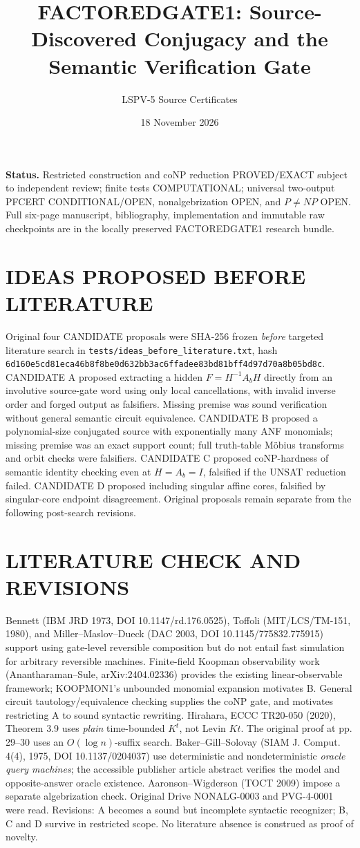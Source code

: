 \documentclass[11pt]{article}
\title{FACTOREDGATE1: Source-Discovered Conjugacy and the Semantic Verification Gate}
\author{LSPV-5 Source Certificates}
\date{18 November 2026}
\begin{document}
\maketitle
\noindent\textbf{Status.} Restricted construction and coNP reduction PROVED/EXACT subject to independent review; finite tests COMPUTATIONAL; universal two-output PFCERT CONDITIONAL/OPEN, nonalgebrization OPEN, and $P\ne NP$ OPEN. Full six-page manuscript, bibliography, implementation and immutable raw checkpoints are in the locally preserved FACTOREDGATE1 research bundle.

\section{IDEAS PROPOSED BEFORE LITERATURE}
Original four CANDIDATE proposals were SHA-256 frozen \emph{before} targeted literature search in \texttt{tests/ideas\_before\_literature.txt}, hash \texttt{6d160e5cd81eca46b8f8be0d632bb3ac6ffadee83bd81bff4d97d70a8b05bd8c}.
CANDIDATE A proposed extracting a hidden $F=H^{-1}A_bH$ directly from an involutive source-gate word using only local cancellations, with invalid inverse order and forged output as falsifiers. Missing premise was sound verification without general semantic circuit equivalence. CANDIDATE B proposed a polynomial-size conjugated source with exponentially many ANF monomials; missing premise was an exact support count; full truth-table M\"obius transforms and orbit checks were falsifiers. CANDIDATE C proposed coNP-hardness of semantic identity checking even at $H=A_b=I$, falsified if the UNSAT reduction failed. CANDIDATE D proposed including singular affine cores, falsified by singular-core endpoint disagreement. Original proposals remain separate from the following post-search revisions.

\section{LITERATURE CHECK AND REVISIONS}
Bennett (IBM JRD 1973, DOI 10.1147/rd.176.0525), Toffoli (MIT/LCS/TM-151, 1980), and Miller--Maslov--Dueck (DAC 2003, DOI 10.1145/775832.775915) support using gate-level reversible composition but do not entail fast simulation for arbitrary reversible machines. Finite-field Koopman observability work (Anantharaman--Sule, arXiv:2404.02336) provides the existing linear-observable framework; KOOPMON1's unbounded monomial expansion motivates B. General circuit tautology/equivalence checking supplies the coNP gate, and motivates restricting A to sound syntactic rewriting. Hirahara, ECCC TR20-050 (2020), Theorem 3.9 uses \emph{plain} time-bounded $K^t$, not Levin $Kt$. The original proof at pp. 29--30 uses an $O(\log n)$-suffix search. Baker--Gill--Solovay (SIAM J. Comput. 4(4), 1975, DOI 10.1137/0204037) use deterministic and nondeterministic \emph{oracle query machines}; the accessible publisher article abstract verifies the model and opposite-answer oracle existence. Aaronson--Wigderson (TOCT 2009) impose a separate algebrization check. Original Drive NONALG-0003 and PVG-4-0001 were read. Revisions: A becomes a sound but incomplete syntactic recognizer; B, C and D survive in restricted scope. No literature absence is construed as proof of novelty.
\end{document}
